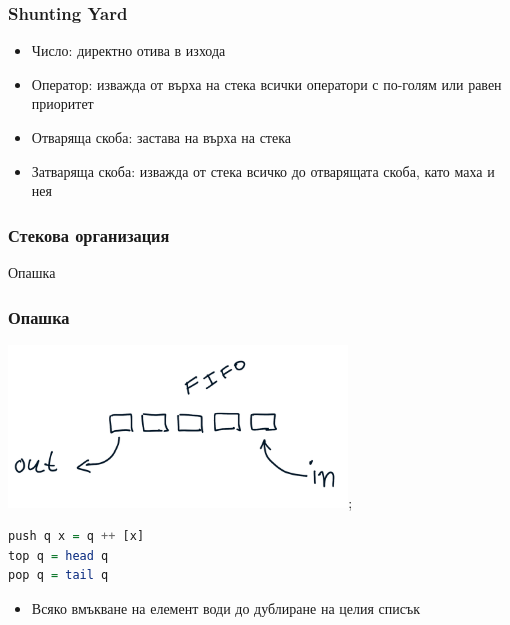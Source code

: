 \documentclass{beamer}
\begin{document}
\begin{frame}[fragile]
  \frametitle{Shunting Yard}
  \begin{itemize}
    \item Число: директно отива в изхода
    \item Оператор: изважда от върха на стека всички оператори с по-голям или равен приоритет
    \item Отваряща скоба: застава на върха на стека
    \item Затваряща скоба: изважда от стека всичко до отварящата скоба, като маха и нея
  \end{itemize}
\end{frame}

\begin{frame}[fragile]
  \frametitle{Стекова организация}


\end{frame}  


\begin{frame}
  \centerline{Опашка}
\end{frame}
  
\begin{frame}[fragile]
  \frametitle{Опашка}

\includegraphics[width=90mm]{images/fifo};

\begin{lstlisting}[basicstyle=\small,language=Haskell]
push q x = q ++ [x]
top q = head q
pop q = tail q
\end{lstlisting}
  
\begin{itemize}
  \item Всяко вмъкване на елемент води до дублиране на целия списък
\end{itemize}

\end{frame} 
\end{document}
